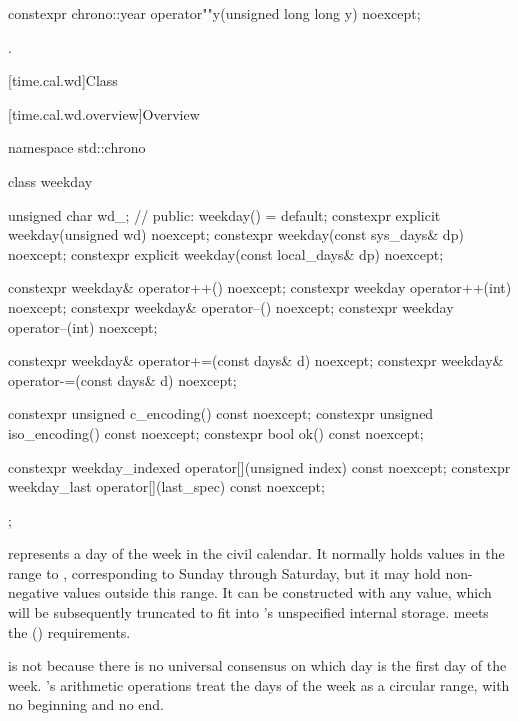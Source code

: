 %
\begin{itemdecl}
constexpr chrono::year operator""y(unsigned long long y) noexcept;
\end{itemdecl}

\begin{itemdescr}
\pnum
\returns
{}.
\end{itemdescr}

[time.cal.wd]{Class }

[time.cal.wd.overview]{Overview}

\begin{codeblock}
namespace std::chrono {
  class weekday {
    unsigned char wd_;          // \expos
  public:
    weekday() = default;
    constexpr explicit weekday(unsigned wd) noexcept;
    constexpr weekday(const sys_days& dp) noexcept;
    constexpr explicit weekday(const local_days& dp) noexcept;

    constexpr weekday& operator++()    noexcept;
    constexpr weekday  operator++(int) noexcept;
    constexpr weekday& operator--()    noexcept;
    constexpr weekday  operator--(int) noexcept;

    constexpr weekday& operator+=(const days& d) noexcept;
    constexpr weekday& operator-=(const days& d) noexcept;

    constexpr unsigned c_encoding() const noexcept;
    constexpr unsigned iso_encoding() const noexcept;
    constexpr bool ok() const noexcept;

    constexpr weekday_indexed operator[](unsigned index) const noexcept;
    constexpr weekday_last    operator[](last_spec) const noexcept;
  };
}
\end{codeblock}

\pnum
{} represents a day of the week in the civil calendar.
It normally holds values in the range  to ,
corresponding to Sunday through Saturday, but
it may hold non-negative values outside this range.
It can be constructed with any  value,
which will be subsequently truncated to fit into 's unspecified internal storage.
 meets the  () requirements.
\begin{note}
 is not
because there is no universal consensus on which day is the first day of the week.
's arithmetic operations treat the days of the week as a circular range,
with no beginning and no end.
\end{note}

